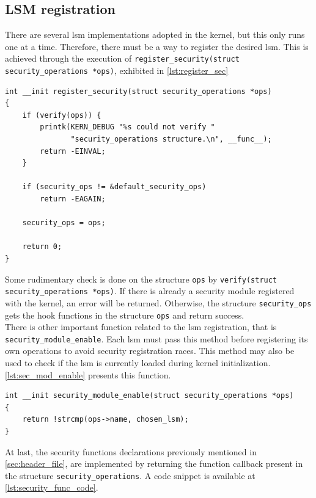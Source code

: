 \subsection{LSM registration}
There are several \gls{lsm} implementations adopted in the kernel, but this only runs one at a time. Therefore, there must be a way to register the desired \gls{lsm}. This is achieved through the execution of \texttt{register\_security(struct security\_operations *ops)}, exhibited in \autoref{lst:register_sec}

\begin{lstlisting}[frame=none, numbers=none, caption=\texttt{register\_security} function (Linux kernel v3.11), label=lst:register_sec]
int __init register_security(struct security_operations *ops)
{
	if (verify(ops)) {
		printk(KERN_DEBUG "%s could not verify "
		       "security_operations structure.\n", __func__);
		return -EINVAL;
	}

	if (security_ops != &default_security_ops)
		return -EAGAIN;

	security_ops = ops;

	return 0;
}
\end{lstlisting}

\noindent
Some rudimentary check is done on the structure \texttt{ops} by \texttt{verify(struct security\_operations *ops)}. If there is already a security module registered with the kernel, an error will be returned. Otherwise, the structure \texttt{security\_ops} gets the hook functions in the structure \texttt{ops} and return success.\\

\noindent
There is other important function related to the \gls{lsm} registration, that is \texttt{security\_module\_enable}. Each \gls{lsm} must pass this method before registering its own operations to avoid security registration races. This method may also be used to check if the \gls{lsm} is currently loaded during kernel initialization. \autoref{lst:sec_mod_enable} presents this function.

\begin{lstlisting}[frame=none, numbers=none, caption=\texttt{register\_security} function (Linux kernel v3.11), label=lst:sec_mod_enable]
int __init security_module_enable(struct security_operations *ops)
{
	return !strcmp(ops->name, chosen_lsm);
}
\end{lstlisting}

\noindent
At last, the security functions declarations previously mentioned in \autoref{sec:header_file}, are implemented by returning the function callback present in the structure \texttt{security\_operations}. A code snippet is available at \autoref{lst:security_func_code}.

